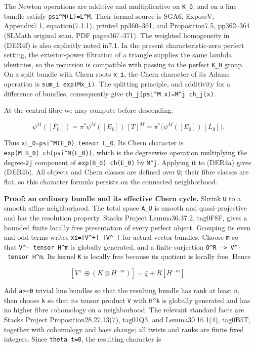 \documentclass[11pt,a4paper]{article}
\theoremstyle{definition}
\begin{document}
The Newton operations are additive and multiplicative on \texttt{K\_0},
and on a line bundle satisfy \texttt{psi\^{}M(L)=L\^{}M}. Their formal
source is SGA6, ExposeV, Appendix7.1, equation(7.1.1), printed
pp360--361, and Proposition7.5, pp362--364 (SLMath original scan, PDF
pages367--371). The weighted homogeneity in (DER4f) is also explicitly
noted in7.1. In the present characteristic-zero perfect setting, the
exterior-power filtration of a triangle supplies the same lambda
identities, so the recursion is compatible with passing to the perfect
\texttt{K\_0} group. On a split bundle with Chern roots \texttt{x\_i},
the Chern character of its Adams operation is
\texttt{sum\_i\ exp(Mx\_i)}. The splitting principle, and additivity for
a difference of bundles, consequently give
\texttt{ch\_j(psi\^{}M\ x)=M\^{}j\ ch\_j(x)}.

At the central fibre we may compute before descending:

\[
 \psi^M([F_0])
 =\pi^*\psi^M([E_0])\,[T]^M
 =\pi^*\bigl(\psi^M([E_0])\,[L_0]\bigr).
\]

Thus \texttt{xi\_0=psi\^{}M(E\_0)\ tensor\ L\_0}. Its Chern character is
\texttt{exp(M\ B\_0)\ ch(psi\^{}M(E\_0))}, which is the degreewise
operation multiplying the degree-\texttt{2j} component of
\texttt{exp(B\_0)\ ch(E\_0)} by \texttt{M\^{}j}. Applying it to (DER4a)
gives (DER4b). All objects and Chern classes are defined over
\texttt{U}; their fibre classes are flat, so this character formula
persists on the connected neighborhood.

\textbf{Proof: an ordinary bundle and its effective Chern cycle.} Shrink
\texttt{U} to a smooth affine neighborhood. The total space
\texttt{A\_U} is smooth and quasi-projective and has the resolution
property. Stacks Project Lemma36.37.2, tag0F8F, gives a bounded finite
locally free presentation of every perfect object. Grouping its even and
odd terms writes \texttt{xi={[}V\^{}+{]}-{[}V\^{}-{]}} for actual vector
bundles. Choose \texttt{m} so that \texttt{V\^{}-\ tensor\ H\^{}m} is
globally generated, and a finite surjection
\texttt{O\^{}R\ -\textgreater{}\ V\^{}-\ tensor\ H\^{}m}. Its kernel
\texttt{K} is locally free because its quotient is locally free. Hence

\[
 [V^+\oplus (K\otimes H^{-m})]
 =\xi+R[H^{-m}].
\]

Add \texttt{a\textgreater{}=0} trivial line bundles so that the
resulting bundle has rank at least \texttt{n}, then choose \texttt{k} so
that its tensor product \texttt{V} with \texttt{H\^{}k} is globally
generated and has no higher fibre cohomology on a neighborhood. The
relevant standard facts are Stacks Project Proposition28.27.13(7),
tag01Q3, and Lemma30.16.1(4), tag0B5T, together with cohomology and base
change; all twists and ranks are finite fixed integers. Since
\texttt{theta\ t=0}, the resulting character is
\end{document}
